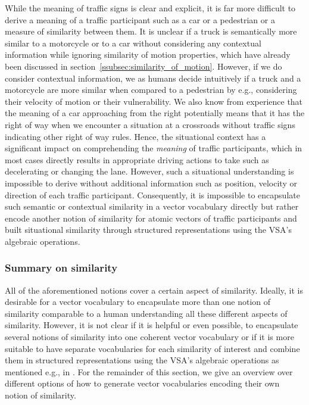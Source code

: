 While the meaning of traffic signs is clear and explicit, it is far more difficult to derive a meaning of a traffic participant such as a car or a pedestrian or a measure of similarity between them.
It is unclear if a truck is semantically more similar to a motorcycle or to a car without considering any contextual information while ignoring similarity of motion properties, which have already been discussed in section~\ref{ssubsec:similarity_of_motion}.
However, if we do consider contextual information, we as humans decide intuitively if a truck and a motorcycle are more similar when compared to a pedestrian by e.g., considering their velocity of motion or their vulnerability.
We also know from experience that the meaning of a car approaching from the right potentially means that it has the right of way when we encounter a situation at a crossroads without traffic signs indicating other right of way rules. 
Hence, the situational context has a significant impact on comprehending the \emph{meaning} of traffic participants, which in most cases directly results in appropriate driving actions to take such as decelerating or changing the lane.
However, such a situational understanding is impossible to derive without additional information such as position, velocity or direction of each traffic participant.
Consequently, it is impossible to encapsulate such semantic or contextual similarity in a vector vocabulary directly but rather encode another notion of similarity for atomic vectors of traffic participants and built situational similarity through structured representations using the \ac{VSA}'s algebraic operations.

\subsubsection{Summary on similarity}%
\label{ssubsec:summary_similarity}

All of the aforementioned notions cover a certain aspect of similarity.
Ideally, it is desirable for a vector vocabulary to encapsulate more than one notion of similarity comparable to a human understanding all these different aspects of similarity.
However, it is not clear if it is helpful or even possible, to encapsulate several notions of similarity into one coherent vector vocabulary or if it is more suitable to have separate vocabularies for each similarity of interest and combine them in structured representations using the \ac{VSA}'s algebraic operations as mentioned e.g., in \textcite{Crawford2016}.
For the remainder of this section, we give an overview over different options of how to generate vector vocabularies encoding their own notion of similarity.

